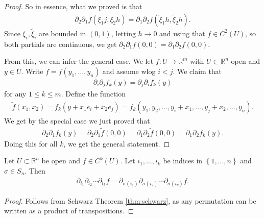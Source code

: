 \begin{proof}
    So in essence, what we proved is that 
    \begin{align*}
        \partial_{2} \partial_{1} f(\xi_{1}j, \xi_{2}h) = \partial_{1} \partial_{2} f(\tilde{\xi}_{1} h, \tilde{\xi}_{2} h). 
    \end{align*}
    Since $\xi_{i}, \tilde{\xi}_{i}$ are bounded in $(0,1)$, letting $h \to 0$ and using that $f \in C^{2}(U)$, so both partials are continuous, we get $\partial_{2} \partial_{1}f(0,0) = \partial_{1} \partial_{2} f(0,0)$. 

    From this, we can infer the general case. We let $f: U \to  \mathbb{R}^{m}$ with $U \subset \mathbb{R}^{n}$ open and $y \in U$. Write $f = f(y_{1}, \dots, y_{n})$ and assume wlog $i < j$. We claim that 
    \begin{align*}
        \partial_{i} \partial_{j} f_{k}(y) = \partial_{j} \partial_{i} f_{k}(y)
    \end{align*}
    for any $1 \leq k \leq m$. Define the function 
    \begin{align*}
        \tilde{f}(x_{1}, x_{2}) = f_{k}(y + x_{1}e_{i} + x_{2} e_{j}) = f_{k}(y_{1}, y_{2}, \dots, y_{i} + x_{1}, \dots, y_{j} + x_{2}, \dots, y_{n}).  
    \end{align*}
    We get by the special case we just proved that
    \begin{align*}
        \partial_{2} \partial_{1} f_{k}(y) = \partial_{2} \partial_{1} \tilde{f}(0,0) = \partial_{1} \partial_{2} \tilde{f}(0,0) = \partial_{1} \partial_{2} f_{k}(y).
    \end{align*}
    Doing this for all $k$, we get the general statement.
\end{proof}

\begin{corollary}\label{cor:perm_partials}
    Let $U \subset \mathbb{R}^{n}$ be open and $f \in C^{k}(U)$. Let $i_{1}, \dots, i_{k}$ be indices in $\left\{ 1, \dots, n \right\}$ and $\sigma \in S_{n}$. Then
    \begin{align*}
        \partial_{i_{1}} \partial_{i_{2}} \cdots \partial_{i_{k}} f = \partial_{\sigma (i_{1})} \partial_{\sigma (i_{2})} \cdots \partial_{\sigma (i_{k})} f.
    \end{align*}
\end{corollary}
\begin{proof}
    Follows from Schwarz Theorem \ref{thm:schwarz}, as any permutation can be written as a product of transpositions.
\end{proof}

